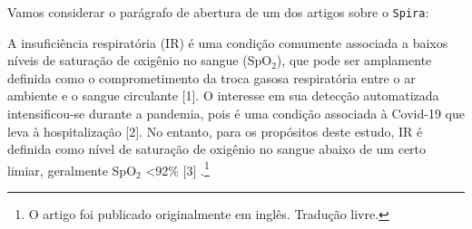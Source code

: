 Vamos considerar o parágrafo de abertura de um dos artigos sobre o \texttt{Spira}:

\begin{citacaoabnt}
A insuficiência respiratória (IR) é uma condição comumente associada a baixos níveis de saturação de oxigênio no sangue (SpO$_2$), que pode ser amplamente definida como o comprometimento da troca gasosa respiratória entre o ar ambiente e o sangue circulante [1]. O interesse em sua detecção automatizada intensificou-se durante a pandemia, pois é uma condição associada à Covid-19 que leva à hospitalização [2]. No entanto, para os propósitos deste estudo, IR é definida como nível de saturação de oxigênio no sangue abaixo de um certo limiar, geralmente SpO$_2$ <92\% [3] \parencite[p.~1]{Gauy2024Discriminant}.\footnote{O artigo foi publicado originalmente em inglês. Tradução livre.}
\end{citacaoabnt}

